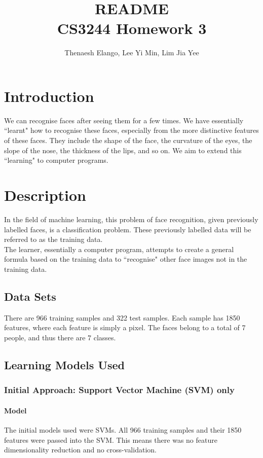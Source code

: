 \documentclass{article}
\title{README \\ CS3244 Homework 3}
\author{Thenaesh Elango, Lee Yi Min, Lim Jia Yee}
\begin{document}
\maketitle
\tableofcontents
\newpage

\section{Introduction}
We can recognise faces after seeing them for a few times. We have essentially ``learnt" how to recognise these faces, especially from the more distinctive features of these faces. They include the shape of the face, the curvature of the eyes, the slope of the nose, the thickness of the lips, and so on. We aim to extend this ``learning" to computer programs.

\section{Description}
In the field of machine learning, this problem of face recognition, given previously labelled faces, is a classification problem. These previously labelled data will be referred to as the training data. \\

The learner, essentially a computer program, attempts to create a general formula based on the training data to ``recognise" other face images not in the training data.

\subsection{Data Sets}
There are 966 training samples and 322 test samples. Each sample has 1850 features, where each feature is simply a pixel. The faces belong to a total of 7 people, and thus there are 7 classes.

\subsection{Learning Models Used}
\subsubsection{Initial Approach: Support Vector Machine (SVM) only}
\paragraph{Model} The initial models used were SVMs. All 966 training samples and their 1850 features were passed into the SVM. This means there was no feature dimensionality reduction and no cross-validation. \\
\end{document}
